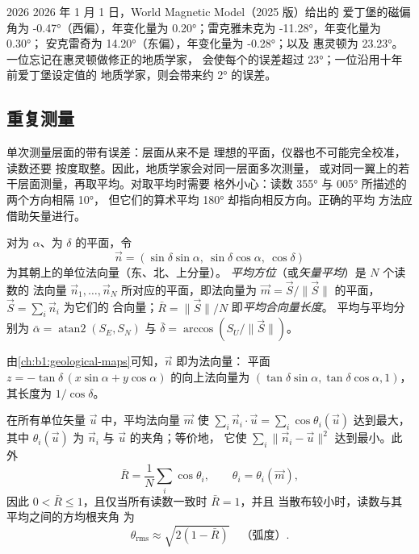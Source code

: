 \begin{dated}{2026}
2026 年 1 月 1 日，World Magnetic Model（2025 版）给出的
爱丁堡的磁偏角为 \ang{-0.47}（西偏），年变化量为
\ang{+0.20}；雷克雅未克为 \ang{-11.28}，年变化量为 \ang{+0.30}；
安克雷奇为 \ang{+14.20}（东偏），年变化量为 \ang{-0.28}；以及
惠灵顿为 \ang{+23.23}。一位忘记在惠灵顿做修正的地质学家，
会使每个的误差超过 \ang{23}；一位沿用十年前爱丁堡设定值的
地质学家，则会带来约
\ang{2} 的误差。
\end{dated}

\subsection{重复测量}

单次测量层面的带有误差：层面从来不是
理想的平面，仪器也不可能完全校准，读数还要
按度取整。因此，地质学家会对同一层面多次测量，
或对同一翼上的若干层面测量，再取平均。对取平均时需要
格外小心：读数 \ang{355} 与 \ang{005} 所描述的两个方向相隔 \ang{10}，
但它们的算术平均 \ang{180} 却指向相反方向。正确的平均
方法应借助矢量进行。

\begin{definition}\label{def:b1:field-lab-methods-1:mean-orientation}
对为 $\alpha$、为 $\delta$ 的平面，令
\[
  \vec n = (\sin\delta\sin\alpha,\ \sin\delta\cos\alpha,\ \cos\delta)
\]
为其朝上的单位法向量（东、北、上分量）。
\emph{平均方位}（或\emph{矢量平均}）是 $N$ 个读数的
法向量 $\vec n_1, \dots, \vec n_N$ 所对应的平面，即法向量为
$\vec m = \vec S/\|\vec S\|$ 的平面，$\vec S = \sum_i \vec n_i$ 为它们的
合向量；$\bar R = \|\vec S\|/N$ 即\emph{平均合向量长度}。
平均与平均分别为 $\bar\alpha = \operatorname{atan2}(S_E, S_N)$
与 $\bar\delta = \arccos(S_U/\|\vec S\|)$。
\end{definition}

由\cref{ch:b1:geological-maps}可知，$\vec n$ 即为法向量：
平面 $z = -\tan\delta\,(x\sin\alpha + y\cos\alpha)$ 的向上法向量为
$(\tan\delta\sin\alpha, \tan\delta\cos\alpha, 1)$，其长度为
$1/\cos\delta$。

\begin{proposition}[矢量平均即最接近的方向]\label{prop:b1:field-lab-methods-1:vector-mean}
在所有单位矢量 $\vec u$ 中，平均法向量 $\vec m$ 使
$\sum_i \vec n_i\cdot\vec u = \sum_i \cos\theta_i(\vec u)$ 达到最大，其中
$\theta_i(\vec u)$ 为 $\vec n_i$ 与 $\vec u$ 的夹角；等价地，
它使 $\sum_i \|\vec n_i - \vec u\|^2$ 达到最小。此外
\[
  \bar R = \frac1N\sum_i \cos\theta_i, \qquad \theta_i = \theta_i(\vec m),
\]
因此 $0 < \bar R \le 1$，且仅当所有读数一致时 $\bar R = 1$，并且
当散布较小时，读数与其平均之间的方均根夹角
为
\[
  \theta_{\text{rms}} \approx \sqrt{2(1 - \bar R)} \quad\text{（弧度）}.
\]
\end{proposition}


